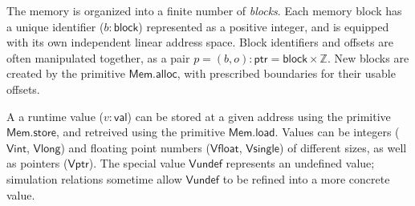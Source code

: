 \documentclass[sigplan,10pt,review,anonymous]{acmart}
\newcommand{\kw}[1]{\ensuremath{ \textsf{#1} }}
\begin{document}
The memory is organized into a finite number of \emph{blocks}.
Each memory block has a unique identifier ($b : \kw{block}$)
represented as a positive integer,
and is equipped with its own independent linear address space.
Block identifiers and offsets are often manipulated together,
as a pair $p = (b, o) : \kw{ptr} = \kw{block} \times \mathbb{Z}$.
New blocks are created by the primitive $\kw{Mem.alloc}$,
with prescribed boundaries for their usable offsets.

A a runtime value ($v : \kw{val}$) can be stored at
a given address using the primitive \kw{Mem.store},
and retreived using the primitive \kw{Mem.load}.
Values can be integers (\kw{Vint}, \kw{Vlong}) and
floating point numbers (\kw{Vfloat}, \kw{Vsingle})
of different sizes,
as well as pointers (\kw{Vptr}).
The special value \kw{Vundef}
represents an undefined value;
simulation relations sometime allow $\kw{Vundef}$
to be refined into a more concrete value.


%
%
%
%
\end{document}
